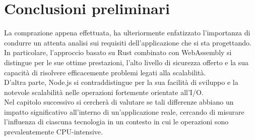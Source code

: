 \section{Conclusioni preliminari}
\label{sec:ConclusioniTecnologie}
La comprazione appena effettuata, ha ulteriormente enfatizzato l'importanza di condurre un attenta analisi sui requisiti dell'applicazione che si sta progettando.
In particolare, l'approccio basato su Rust combinato con WebAssembly si distingue per le sue ottime prestazioni, l'alto livello di sicurezza offerto e la sua capacità di risolvere efficacemente problemi legati alla scalabilità.
\\D'altra parte, Node.js si contraddistingue per la sua facilità di sviluppo e la notevole scalabilità nelle operazioni fortemente orientate all'I/O.
\\Nel capitolo successivo si cercherà di valutare se tali differenze abbiano un impatto significativo all'interno di un'applicazione reale, cercando di misurare l'influenza di ciascuna tecnologia in un contesto in cui le operazioni sono prevalentemente CPU-intensive.